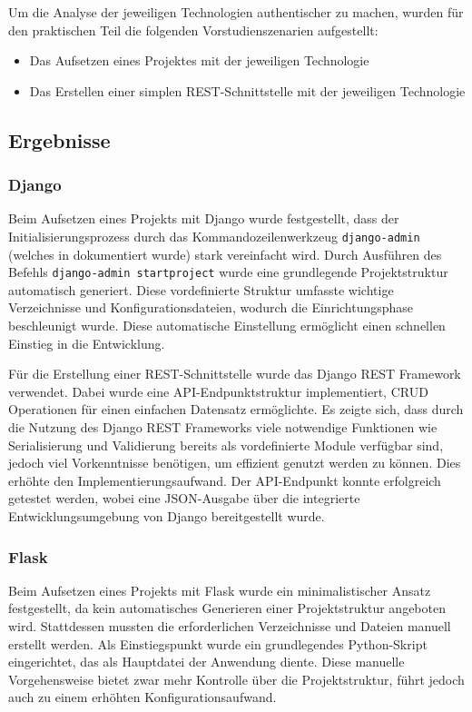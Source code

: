 Um die Analyse der jeweiligen Technologien authentischer zu machen, wurden für den praktischen Teil die folgenden Vorstudienszenarien aufgestellt:

\begin{itemize}
	\item Das Aufsetzen eines Projektes mit der jeweiligen Technologie
	\item Das Erstellen einer simplen REST-Schnittstelle mit der jeweiligen Technologie
\end{itemize}

\subsection{Ergebnisse}

\subsubsection{Django}

Beim Aufsetzen eines Projekts mit Django wurde festgestellt, dass der Initialisierungsprozess durch das Kommandozeilenwerkzeug \texttt{django-admin} (welches in \cite{website-django-admin} dokumentiert wurde) stark vereinfacht wird. Durch Ausführen des Befehls \texttt{django-admin startproject} wurde eine grundlegende Projektstruktur automatisch generiert. Diese vordefinierte Struktur umfasste wichtige Verzeichnisse und Konfigurationsdateien, wodurch die Einrichtungsphase beschleunigt wurde. Diese automatische Einstellung ermöglicht einen schnellen Einstieg in die Entwicklung.

Für die Erstellung einer REST-Schnittstelle wurde das Django REST Framework verwendet. Dabei wurde eine API-Endpunktstruktur implementiert, \gls{CRUD} Operationen für einen einfachen Datensatz ermöglichte. Es zeigte sich, dass durch die Nutzung des Django REST Frameworks viele notwendige Funktionen wie Serialisierung und Validierung bereits als vordefinierte Module verfügbar sind, jedoch viel Vorkenntnisse benötigen, um effizient genutzt werden zu können. Dies erhöhte den Implementierungsaufwand. Der API-Endpunkt konnte erfolgreich getestet werden, wobei eine JSON-Ausgabe über die integrierte Entwicklungsumgebung von Django bereitgestellt wurde.

\subsubsection{Flask}

Beim Aufsetzen eines Projekts mit Flask wurde ein minimalistischer Ansatz festgestellt, da kein automatisches Generieren einer Projektstruktur angeboten wird. Stattdessen mussten die erforderlichen Verzeichnisse und Dateien manuell erstellt werden. Als Einstiegspunkt wurde ein grundlegendes Python-Skript eingerichtet, das als Hauptdatei der Anwendung diente. Diese manuelle Vorgehensweise bietet zwar mehr Kontrolle über die Projektstruktur, führt jedoch auch zu einem erhöhten Konfigurationsaufwand.

